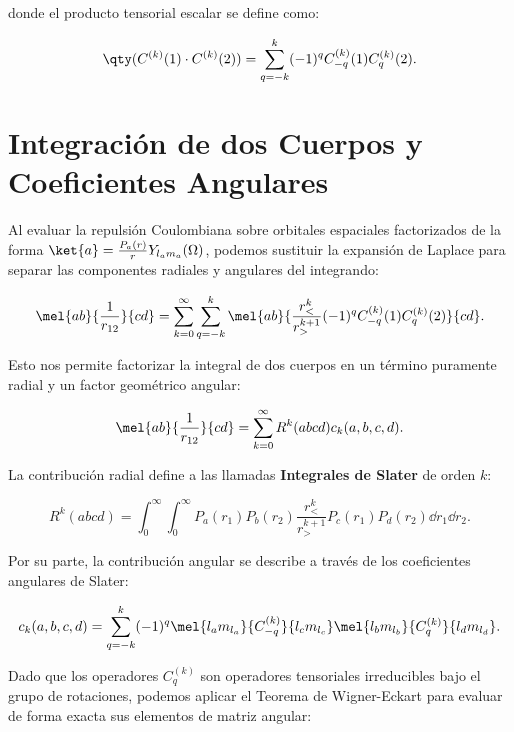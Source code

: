 donde el producto tensorial escalar se define como:

\begin{equation}
  \qty( C^{(k)}(1) \cdot C^{(k)}(2) ) = \sum_{q=-k}^k (-1)^q C_{-q}^{(k)}(1) C_q^{(k)}(2).
\end{equation}

\section{Integración de dos Cuerpos y Coeficientes Angulares}

Al evaluar la repulsión Coulombiana sobre orbitales espaciales factorizados de la forma \( \ket{a} = \frac{P_a(r)}{r} Y_{l_a m_a}(\Omega) \), podemos sustituir la expansión de Laplace para separar las componentes radiales y angulares del integrando:

\begin{equation}
  \mel{ab}{\frac{1}{r_{12}}}{cd} = \sum_{k=0}^{\infty} \sum_{q=-k}^k \mel{ab}{\frac{r_{<}^k}{r_{>}^{k+1}} (-1)^q C_{-q}^{(k)}(1) C_q^{(k)}(2)}{cd}.
\end{equation}

Esto nos permite factorizar la integral de dos cuerpos en un término puramente radial y un factor geométrico angular:

\begin{equation}
  \mel{ab}{\frac{1}{r_{12}}}{cd} = \sum_{k=0}^{\infty} R^k(abcd) c_k(a,b,c,d).
\end{equation}

La contribución radial define a las llamadas \textbf{Integrales de Slater} de orden \( k \):

\begin{equation}
  \label{eq:slater-integral}
  R^k(abcd) = \int_0^\infty \int_0^\infty P_a(r_1) P_b(r_2) \frac{r_{<}^k}{r_{>}^{k+1}} P_c(r_1) P_d(r_2) \dd{r_1} \dd{r_2}.
\end{equation}

Por su parte, la contribución angular se describe a través de los coeficientes angulares de Slater:

\begin{equation}
  c_k(a,b,c,d) = \sum_{q=-k}^k (-1)^q \mel{l_a m_{l_a}}{C_{-q}^{(k)}}{l_c m_{l_c}} \mel{l_b m_{l_b}}{C_q^{(k)}}{l_d m_{l_d}}.
\end{equation}

Dado que los operadores \( C_{q}^{(k)} \) son operadores tensoriales irreducibles bajo el grupo de rotaciones, podemos aplicar el Teorema de Wigner-Eckart para evaluar de forma exacta sus elementos de matriz angular:

